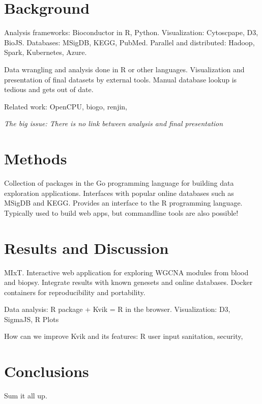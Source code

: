



\section*{Background}
Analysis frameworks: Bioconductor in R, Python.
Visualization: Cytoscpape, D3, BioJS.
Databases: MSigDB, KEGG, PubMed.
Parallel and distributed: Hadoop, Spark, Kubernetes, Azure. 

Data wrangling and analysis done in R or other languages.
Visualization and presentation of final datasets by external tools.
Manual database lookup is tedious and gets out of date.

Related work: OpenCPU, biogo, renjin, 

\emph{The big issue: There is no link between analysis and final presentation} 

\section*{Methods}
Collection of packages in the Go programming language for building data
exploration applications.  Interfaces with popular online databases such as
MSigDB and KEGG.  Provides an interface to the R programming language.
Typically used to build web apps, but commandline tools are also possible!


\section*{Results and Discussion}
MIxT. 
Interactive web application for exploring WGCNA modules from blood and biopsy.
Integrate results with known genesets and online databases.
Docker containers for reproducibility and portability.

Data analysis: R package  + Kvik = R in the browser. 
Visualization: D3, SigmaJS, R Plots 

How can we improve Kvik and its features: R user input sanitation, security, 


\section*{Conclusions}
Sum it all up. 

